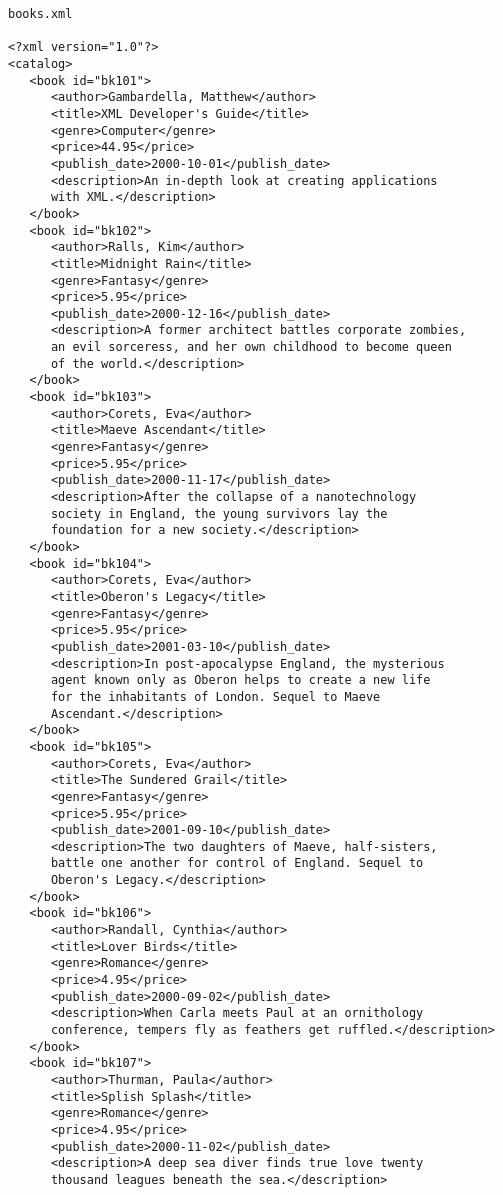 \documentclass[11pt,english]{article}
\begin{document}
\begin{lstlisting}
books.xml

<?xml version="1.0"?>
<catalog>
   <book id="bk101">
      <author>Gambardella, Matthew</author>
      <title>XML Developer's Guide</title>
      <genre>Computer</genre>
      <price>44.95</price>
      <publish_date>2000-10-01</publish_date>
      <description>An in-depth look at creating applications 
      with XML.</description>
   </book>
   <book id="bk102">
      <author>Ralls, Kim</author>
      <title>Midnight Rain</title>
      <genre>Fantasy</genre>
      <price>5.95</price>
      <publish_date>2000-12-16</publish_date>
      <description>A former architect battles corporate zombies, 
      an evil sorceress, and her own childhood to become queen 
      of the world.</description>
   </book>
   <book id="bk103">
      <author>Corets, Eva</author>
      <title>Maeve Ascendant</title>
      <genre>Fantasy</genre>
      <price>5.95</price>
      <publish_date>2000-11-17</publish_date>
      <description>After the collapse of a nanotechnology 
      society in England, the young survivors lay the 
      foundation for a new society.</description>
   </book>
   <book id="bk104">
      <author>Corets, Eva</author>
      <title>Oberon's Legacy</title>
      <genre>Fantasy</genre>
      <price>5.95</price>
      <publish_date>2001-03-10</publish_date>
      <description>In post-apocalypse England, the mysterious 
      agent known only as Oberon helps to create a new life 
      for the inhabitants of London. Sequel to Maeve 
      Ascendant.</description>
   </book>
   <book id="bk105">
      <author>Corets, Eva</author>
      <title>The Sundered Grail</title>
      <genre>Fantasy</genre>
      <price>5.95</price>
      <publish_date>2001-09-10</publish_date>
      <description>The two daughters of Maeve, half-sisters, 
      battle one another for control of England. Sequel to 
      Oberon's Legacy.</description>
   </book>
   <book id="bk106">
      <author>Randall, Cynthia</author>
      <title>Lover Birds</title>
      <genre>Romance</genre>
      <price>4.95</price>
      <publish_date>2000-09-02</publish_date>
      <description>When Carla meets Paul at an ornithology 
      conference, tempers fly as feathers get ruffled.</description>
   </book>
   <book id="bk107">
      <author>Thurman, Paula</author>
      <title>Splish Splash</title>
      <genre>Romance</genre>
      <price>4.95</price>
      <publish_date>2000-11-02</publish_date>
      <description>A deep sea diver finds true love twenty 
      thousand leagues beneath the sea.</description>

\end{lstlisting}
\end{document}

